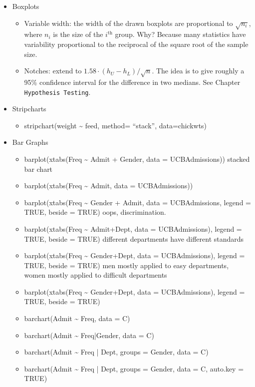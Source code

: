 \documentclass[10pt,english]{scrbook}
\begin{document}
\begin{itemize}
\item Boxplots
\begin{itemize}
\item Variable width: the width of the drawn boxplots are proportional to \(\sqrt{n_{i}}\), where \(n_{i}\) is the size of the \(i^{\mathrm{th}}\) group. Why? Because many statistics have variability proportional to the reciprocal of the square root of the sample size.
\item Notches: extend to \(1.58\cdot(h_{U}-h_{L})/\sqrt{n}\). The idea is to give roughly a 95\% confidence interval for the difference in two medians. See Chapter \texttt{Hypothesis Testing}.
\end{itemize}
\item Stripcharts
\begin{itemize}
\item stripchart(weight \textasciitilde{} feed, method= ``stack'', data=chickwts)
\end{itemize}
\item Bar Graphs
\begin{itemize}
\item barplot(xtabs(Freq \textasciitilde{} Admit + Gender, data = UCBAdmissions)) stacked bar chart
\item barplot(xtabs(Freq \textasciitilde{} Admit, data = UCBAdmissions))
\item barplot(xtabs(Freq \textasciitilde{} Gender + Admit, data = UCBAdmissions, legend = TRUE, beside = TRUE)  oops, discrimination.
\item barplot(xtabs(Freq \textasciitilde{} Admit+Dept, data = UCBAdmissions), legend = TRUE, beside = TRUE) different departments have different standards
\item barplot(xtabs(Freq \textasciitilde{} Gender+Dept, data = UCBAdmissions), legend = TRUE, beside = TRUE) men mostly applied to easy departments, women mostly applied to difficult departments
\item barplot(xtabs(Freq \textasciitilde{} Gender+Dept, data = UCBAdmissions), legend = TRUE, beside = TRUE)
\item barchart(Admit \textasciitilde{} Freq, data = C)
\item barchart(Admit \textasciitilde{} Freq|Gender, data = C)
\item barchart(Admit \textasciitilde{} Freq | Dept, groups = Gender, data = C)
\item barchart(Admit \textasciitilde{} Freq | Dept, groups = Gender, data = C, auto.key = TRUE)
\end{itemize}


\end{itemize}
\end{document}

